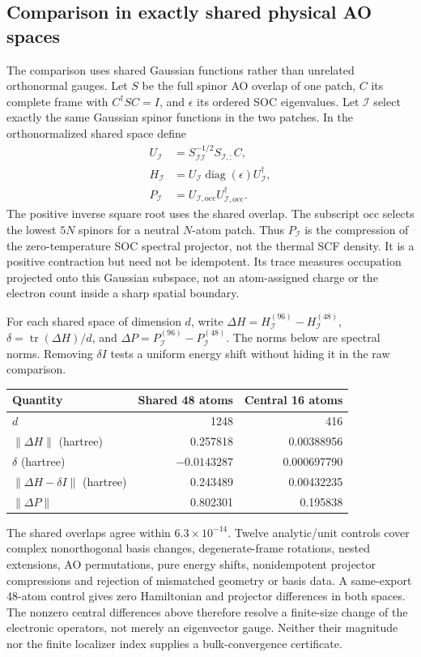 \documentclass[11pt]{article}
\begin{document}
\clearpage
\subsection{Comparison in exactly shared physical AO spaces}
The comparison uses shared Gaussian functions rather than unrelated
orthonormal gauges. Let $S$ be the full spinor AO overlap of one patch,
$C$ its complete frame with $C^\dagger SC=I$, and
$\epsilon$ its ordered SOC eigenvalues. Let $\mathcal I$
select exactly the same Gaussian spinor functions in the two
patches. In the orthonormalized shared space define
\begin{align}
 U_{\mathcal I}&=S_{\mathcal I\mathcal I}^{-1/2}
                    S_{\mathcal I,:}C,\\
 H_{\mathcal I}&=U_{\mathcal I}\operatorname{diag}(\epsilon)
                    U_{\mathcal I}^{\dagger},\\
 P_{\mathcal I}&=U_{\mathcal I,\mathrm{occ}}
                    U_{\mathcal I,\mathrm{occ}}^{\dagger}.
\end{align}
The positive inverse square root uses the shared overlap.
The subscript $\mathrm{occ}$ selects the lowest $5N$ spinors
for a neutral $N$-atom patch. Thus $P_{\mathcal I}$ is the
compression of the zero-temperature SOC spectral projector,
not the thermal SCF density. It is a positive contraction but
need not be idempotent. Its trace measures occupation projected
onto this Gaussian subspace, not an atom-assigned charge or the
electron count inside a sharp spatial boundary.

For each shared space of dimension $d$, write
$\Delta H=H_{\mathcal I}^{(96)}-H_{\mathcal I}^{(48)}$,
$\delta=\operatorname{tr}(\Delta H)/d$, and
$\Delta P=P_{\mathcal I}^{(96)}-P_{\mathcal I}^{(48)}$.
The norms below are spectral norms. Removing $\delta I$ tests
a uniform energy shift without hiding it in the raw comparison.
\begin{center}
\begin{tabular}{lrr}
\hline
Quantity & Shared 48 atoms & Central 16 atoms \\
\hline
$d$ & 1248 & 416 \\
$\|\Delta H\|$ (hartree) & 0.257818 & 0.00388956 \\
$\delta$ (hartree) & $-0.0143287$ & 0.000697790 \\
$\|\Delta H-\delta I\|$ (hartree) & 0.243489 & 0.00432235 \\
$\|\Delta P\|$ & 0.802301 & 0.195838 \\
\hline
\end{tabular}
\end{center}
The shared overlaps agree within $6.3\times10^{-14}$.
Twelve analytic/unit controls cover complex nonorthogonal
basis changes, degenerate-frame rotations, nested extensions,
AO permutations, pure energy shifts, nonidempotent projector
compressions and rejection of mismatched geometry or basis data.
A same-export 48-atom control gives zero Hamiltonian and
projector differences in both spaces. The nonzero central
differences above therefore resolve a finite-size change of
the electronic operators, not merely an eigenvector gauge.
Neither their magnitude nor the finite localizer index supplies
a bulk-convergence certificate.
\end{document}
